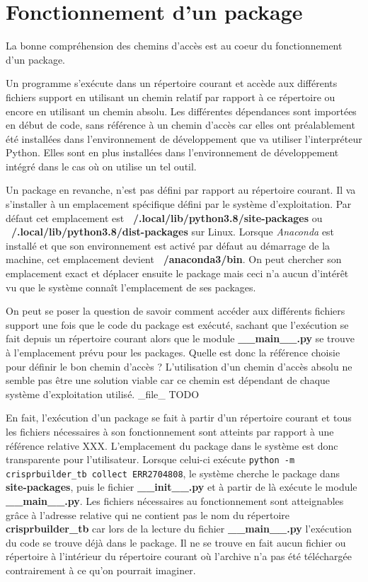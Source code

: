 \documentclass[twoside,a4paper,11pt,frenchb,openany]{report}
\begin{document}
\section{Fonctionnement d'un package}

La bonne compréhension des chemins d'accès est au coeur du fonctionnement d'un package.

Un programme s'exécute dans un répertoire courant et accède aux différents fichiers support en utilisant un chemin relatif par rapport à ce répertoire ou encore en utilisant un chemin absolu. Les différentes dépendances sont importées en début de code, sans référence à un chemin d'accès car elles ont préalablement été installées dans l'environnement de développement que va utiliser l'interpréteur Python. Elles sont en plus installées dans l'environnement de développement intégré dans le cas où on utilise un tel outil.

Un package en revanche, n'est pas défini par rapport au répertoire courant. Il va s'installer à un emplacement spécifique défini par le système d'exploitation. Par défaut cet emplacement est \textbf{~/.local/lib/python3.8/site-packages} ou \textbf{~/.local/lib/python3.8/dist-packages} sur Linux. Lorsque \textit{Anaconda} est installé et que son environnement est activé par défaut au démarrage de la machine, cet emplacement devient \textbf{~/anaconda3/bin}. On peut chercher son emplacement exact et déplacer ensuite le package mais ceci n'a aucun d'intérêt vu que le système connaît l'emplacement de ses packages.

On peut se poser la question de savoir comment accéder aux différents fichiers support une fois que le code du package est exécuté, sachant que l'exécution se fait depuis un répertoire courant alors que le module \textbf{\_\_main\_\_.py} se trouve à l'emplacement prévu pour les packages. Quelle est donc la référence choisie pour définir le bon chemin d'accès ? L'utilisation d'un chemin d'accès absolu ne semble pas être une solution viable car ce chemin est dépendant de chaque système d'exploitation utilisé. \_file\_ TODO

En fait, l'exécution d'un package se fait à partir d'un répertoire courant et tous les fichiers nécessaires à son fonctionnement sont atteints par rapport à une référence relative XXX. L'emplacement du package dans le système est donc transparente pour l'utilisateur. Lorsque celui-ci exécute \texttt{python -m crisprbuilder\_tb \textemdash \textemdash collect ERR2704808}, le système cherche le package dans \textbf{site-packages}, puis le fichier \textbf{\_\_init\_\_.py} et à partir de là exécute le module \textbf{\_\_main\_\_.py}. Les fichiers nécessaires au fonctionnement sont atteignables grâce à l'adresse relative qui ne contient pas le nom du répertoire \textbf{crisprbuilder\_tb} car lors de la lecture du fichier \textbf{\_\_main\_\_.py} l'exécution du code se trouve déjà dans le package. Il ne se trouve en fait aucun fichier ou répertoire à l'intérieur du répertoire courant où l'archive n'a pas été téléchargée contrairement à ce qu'on pourrait imaginer.
\end{document}
